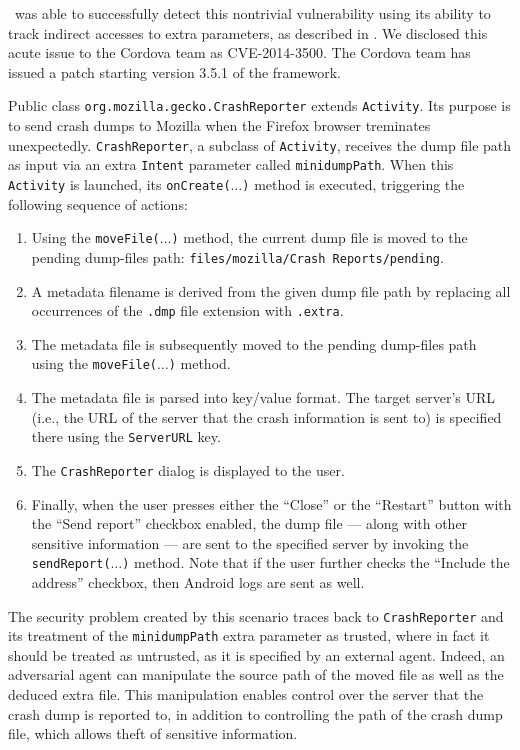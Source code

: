 \Tool\ was able to successfully detect this nontrivial vulnerability using its ability to track indirect accesses to extra parameters, as described in .
We  disclosed this acute issue to the Cordova team as CVE-2014-3500. The Cordova team has issued a patch starting version 3.5.1 of the framework.

\label{Se:FirefoxFileManipulation}
Public class {\tt org.mozilla.gecko.CrashReporter} extends {\tt Activity}. Its purpose is to send crash dumps to Mozilla when the Firefox browser treminates unexpectedly.
{\tt CrashReporter}, a subclass of {\tt Activity}, receives the dump file path as input via an extra {\tt Intent} parameter called {\tt minidumpPath}. When this {\tt Activity} is launched, its {\tt onCreate($\ldots$)} method is executed, triggering the following sequence of actions:
\begin{enumerate}
	\item Using the \texttt{moveFile($\ldots$)} method, the current dump file is moved to the pending dump-files path: \texttt{files/mozilla/Crash Reports/pending}.
	\item A metadata filename is derived from the given dump file path by replacing all occurrences of the {\tt .dmp} file extension with  {\tt .extra}. 
	\item The metadata file is subsequently moved to the pending dump-files path using the \texttt{moveFile($\ldots$)} method.
	\item The metadata file is parsed into key/value format. The target server's URL (i.e., the URL of the server that the crash information is sent to) is specified there using the \texttt{ServerURL} key.
	\item The {\tt CrashReporter} dialog is displayed to the user.
	\item Finally, when the user presses either the ``Close'' or the ``Restart'' button with the ``Send report'' checkbox enabled, the dump file --- along with other sensitive information --- are sent to the specified server by invoking the {\tt sendReport($\ldots$)} method. Note that if the user further checks the ``Include the address'' checkbox, then Android logs are sent as well.
\end{enumerate}

The security problem created by this scenario traces back to {\tt CrashReporter} and its treatment of the {\tt minidumpPath} extra parameter as trusted, where in fact it should be treated as untrusted, as it is specified by an external agent.
%
Indeed, an adversarial agent can manipulate the source path of the moved file as well as the deduced extra file. 
This manipulation enables control over the server that the crash dump is reported to, in addition to controlling the path of the crash dump file, which allows theft of sensitive information.

